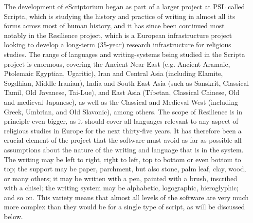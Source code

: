 The development of eScriptorium began as part of a larger project at PSL called
Scripta, which is studying the history and practice of writing in almost all
its forms across most of human history, and it has since been continued most
notably in the Resilience project, which is a European infrastructure project
looking to develop a long-term (35-year) research infrastructure for religious
studies. The range of languages and writing-systems being studied in the
Scripta project is enormous, covering the Ancient Near East (e.g. Ancient
Aramaic, Ptolemaic Egyptian, Ugaritic), Iran and Central Asia (including
Elamite, Sogdhian, Middle Iranian), India and South-East Asia (such as
Sanskrit, Classical Tamil, Old Javanese, Tai-Lue), and East Asia (Tibetan,
Classical Chinese, Old and medieval Japanese), as well as the Classical and
Medieval West (including Greek, Umbrian, and Old Slavonic), among others. The
scope of Resilience is in principle even bigger, as it should cover all
languages relevant to any aspect of religious studies in Europe for the next
thirty-five years. It has therefore been a crucial element of the project that
the software must avoid as far as possible all assumptions about the nature of
the writing and language that is in the system. The writing may be left to
right, right to left, top to bottom or even bottom to top; the support may be
paper, parchment, but also stone, palm leaf, clay, wood, or many others; it may
be written with a pen, painted with a brush, inscribed with a chisel; the
writing system may be alphabetic, logographic, hieroglyphic; and so on. This
variety means that almost all levels of the software are very much more complex
than they would be for a single type of script, as will be discussed below.

